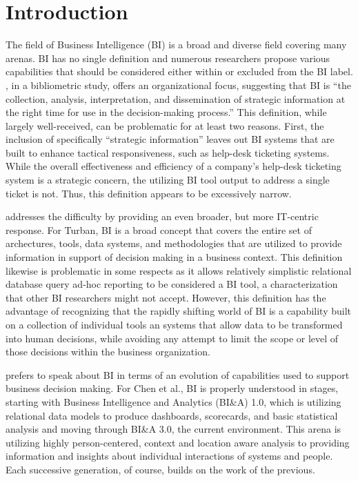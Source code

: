 \section{Introduction}

 The field of Business Intelligence (BI) is a broad and diverse field covering many arenas. BI has no single definition and numerous researchers propose various capabilities that should be considered either within or excluded from the BI label. \textcite{lopez-robles30YearsIntelligence2019}, in a bibliometric study, offers an organizational focus, suggesting that BI is ``the collection, analysis, interpretation, and dissemination of strategic information at the right time for use in the decision-making process.'' This definition, while largely well-received, can be problematic for at least two reasons. First, the inclusion of specifically ``strategic information'' leaves out BI systems that are built to enhance tactical responsiveness, such as help-desk ticketing systems. While the overall effectiveness and efficiency of a company's help-desk ticketing system is a strategic concern, the utilizing BI tool output to address a single ticket is not. Thus, this definition appears to be excessively narrow.

 \textcite{turbanBusinessIntelligenceManagerial2011} addresses the difficulty by providing an even broader, but more IT-centric response. For Turban, BI is a broad concept that covers the entire set of archectures, tools, data systems, and methodologies that are utilized to provide information in support of decision making in a business context. This definition likewise is problematic in some respects as it allows relatively simplistic relational database query ad-hoc reporting to be considered a BI tool, a characterization that other BI researchers might not accept. However, this definition has the advantage of recognizing that the rapidly shifting world of BI is a capability built on a collection of individual tools an systems that allow data to be transformed into human decisions, while avoiding any attempt to limit the scope or level of those decisions within the business organization.

 \textcite{chenBusinessIntelligenceAnalytics2012} prefers to speak about BI in terms of an evolution of capabilities used to support business decision making. For Chen et al., BI is properly understood in stages, starting with Business Intelligence and Analytics (BI\&A) 1.0, which is utilizing relational data models to produce dashboards, scorecards, and basic statistical analysis and moving through BI\&A 3.0, the current environment. This arena is utilizing highly person-centered, context and location aware analysis to providing information and insights about individual interactions of systems and people. Each successive generation, of course, builds on the work of the previous.

